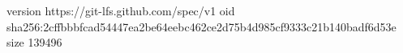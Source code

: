 version https://git-lfs.github.com/spec/v1
oid sha256:2cffbbbfcad54447ea2be64eebc462ce2d75b4d985cf9333c21b140badf6d53e
size 139496
